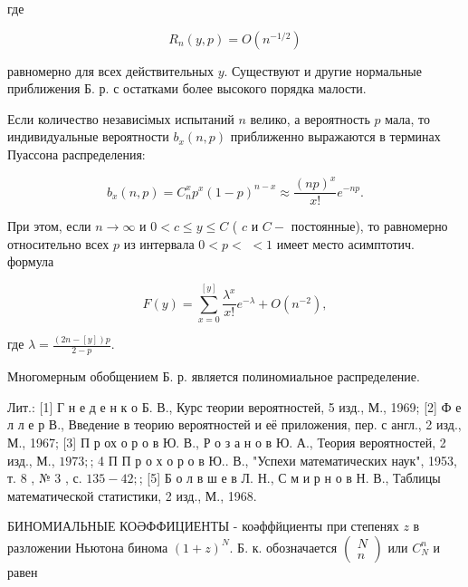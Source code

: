 \documentclass[10pt]{article}
\begin{document}
где



\[

R_{n}(y, p)=O\left(n^{-1 / 2}\right)

\]



равномерно для всех действительных $y$. Существуют и другие нормальные приближения Б. р. с остатками более высокого порядка малости.



Если количество независімых испытаний $n$ велико, а вероятность $p$ мала, то индивидуальные вероятности $b_{x}(n, p)$ приближенно выражаются в терминах Пуассона распределения:



\[

b_{x}(n, p)=C_{n}^{x} p^{x}(1-p)^{n-x} \approx \frac{(n p)^{x}}{x !} e^{-n p} .

\]



При этом, если $n \rightarrow \infty$ и $0<c \leqslant y \leqslant C$ ( $c$ и $C-$ постоянные), то равномерно относительно всех $p$ из интервала $0<p<$ $<1$ имеет место асимптотич. формула



\[

F(y)=\sum_{x=0}^{[y]} \frac{\lambda^{x}}{x !} e^{-\lambda}+O\left(n^{-2}\right),

\]



где $\lambda=\frac{(2 n-[y]) p}{2-p}$.



Многомерным обобщением Б. р. является полиномиальное распределение.



Лит.: [1] Г н е д е н к о Б. В., Курс теории вероятностей, 5 изд., М., 1969; [2] Ф е л л е р В., Введение в теорию вероятностей и её приложения, пер. с англ., 2 изд., М., 1967; [3] П р ох о р о в Ю. В., Р о з а н о в Ю. А., Теория вероятностей, 2 изд., М., $1973 ;$; 4 П П р о х о р о в Ю.. В., "Успехи математических наук", 1953, т. 8 , № 3 , с. $135-42 ;$; [5] Б о л в ш е в Л. Н., С м и р н о в Н. В., Таблицы математической статистики, 2 изд., М., 1968.



БИНОМИАЛЬНЫЕ КОӘФФИЦИЕНТЫ - коәффйциенты при степенях $z$ в разложении Ньютона бинома $(1+z)^{N}$. Б. к. обозначается $\left(\begin{array}{l}N \\ n\end{array}\right)$ или $C_{N}^{n}$ и равен
\end{document}
